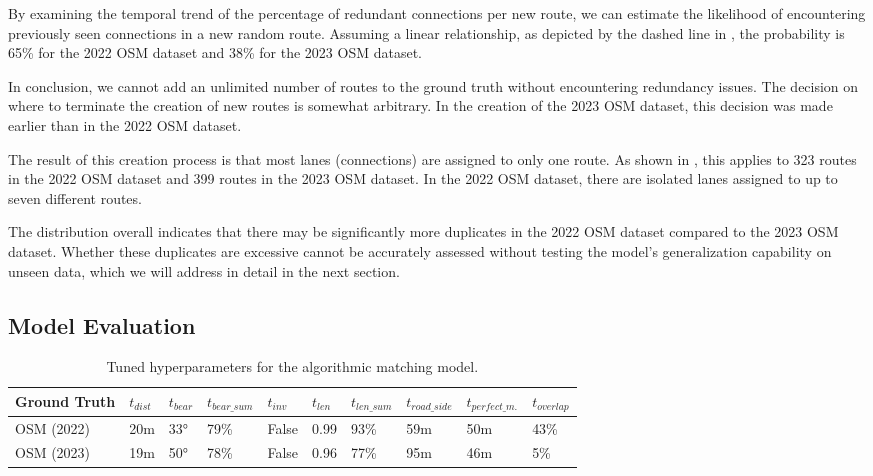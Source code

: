 By examining the temporal trend of the percentage of redundant connections per new route, we can estimate the likelihood of encountering previously seen connections in a new random route. Assuming a linear relationship, as depicted by the dashed line in , the probability is 65\% for the 2022 OSM dataset and 38\% for the 2023 OSM dataset.

In conclusion, we cannot add an unlimited number of routes to the ground truth without encountering redundancy issues. The decision on where to terminate the creation of new routes is somewhat arbitrary. In the creation of the 2023 OSM dataset, this decision was made earlier than in the 2022 OSM dataset.

The result of this creation process is that most lanes (connections) are assigned to only one route. As shown in , this applies to 323 routes in the 2022 OSM dataset and 399 routes in the 2023 OSM dataset. In the 2022 OSM dataset, there are isolated lanes assigned to up to seven different routes.

The distribution overall indicates that there may be significantly more duplicates in the 2022 OSM dataset compared to the 2023 OSM dataset. Whether these duplicates are excessive cannot be accurately assessed without testing the model's generalization capability on unseen data, which we will address in detail in the next section.

\subsection{Model Evaluation}

\begin{table}[h]
\caption{Tuned hyperparameters for the algorithmic matching model.}
\begin{tabular}{@{}llllllllll@{}}
\toprule
\textbf{Ground Truth} & $t_{dist}$ & $t_{bear}$ & $t_{bear\_sum}$ & $t_{inv}$ & $t_{len}$ & $t_{len\_sum}$ & $t_{road\_side}$ &  $t_{perfect\_m.}$ & $t_{overlap}$ \\
  \midrule
  OSM (2022) & 20m & 33° & 79\% & False & 0.99 & 93\% & 59m & 50m & 43\% \\
  OSM (2023) & 19m & 50° & 78\% & False & 0.96 & 77\% & 95m & 46m & 5\% \\
\bottomrule
\end{tabular}
\label{tab:hyperparameter-tuning-results}
\end{table}

